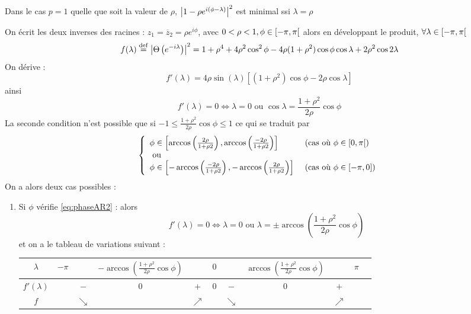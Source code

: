 \documentclass{report}
\begin{document}
\begin{Ex}[Cas où p=1]
Dans le cas $p=1$ quelle que soit la valeur de $\rho$, ${ \left| 1-\rho e^{i(\phi-\lambda)} \right|}^2$ est minimal ssi $\lambda = \rho$
\end{Ex}
\begin{Ex}[Cas où p=2 à racines complexes conjuguées]\label{ex:TVAR2}
On écrit les deux inverses des racines : $z_1=\overline{z}_2 = \rho e^{i\phi}$, avec $0<\rho<1, \phi \in {\left[ -\pi,\pi \right[}$ alors en développant le produit, $\forall \lambda \in {\left[ -\pi,\pi \right[}$
$$
f(\lambda) \stackrel{\rm def}{=} { \left| \Theta\left( e^{-i\lambda}\right) \right|}^2 = 1 + \rho^4 + 4\rho^2 \cos^2{\phi} - 4\rho(1+\rho^2)\cos{\phi} \cos{\lambda} + 2\rho^2\cos{2\lambda}
$$
On dérive :
$$
f'(\lambda) = 4\rho \sin(\lambda) \left[ (1+\rho^2) \cos{\phi} - 2\rho \cos{\lambda} \right]
$$
ainsi 
$$
f'(\lambda)=0 \iff \lambda = 0 \mbox{ ou } \cos{\lambda} = \frac{1+\rho^2}{2\rho} \cos{\phi}
$$
La seconde condition n'est possible que si $ -1\leq \frac{1+\rho^2}{2\rho} \cos{\phi} \leq 1$ ce qui se traduit par 
\begin{equation}\label{eq:phaseAR2}
{ \left\lbrace \begin{array}{ll} 
\phi \in {\left[ \arccos\left( \frac{2\rho}{1+\rho2} \right), \arccos\left( \frac{-2\rho}{1+\rho2} \right) \right]} & \mbox{ (cas où $\phi \in {\left[ 0,\pi \right[}$)} \\
\mbox{ ou } & \\
\phi \in {\left[ -\arccos\left( \frac{-2\rho}{1+\rho2} \right), -\arccos\left( \frac{2\rho}{1+\rho2} \right) \right]} & \mbox{ (cas où $\phi \in {\left[ -\pi,0 \right]}$)} \\
 \end{array} \right. }
\end{equation}
On a alors deux cas possibles :
\begin{enumerate}
\item Si $\phi$ vérifie \eqref{eq:phaseAR2} : alors 
$$
f'(\lambda)=0 \iff \lambda = 0 \mbox{ ou } \lambda = \pm \arccos\left(\frac{1+\rho^2}{2\rho} \cos{\phi}\right)
$$
et on a le tableau de variations suivant : \\
\begin{center}
\begin{tabular}{c|cccccccccc}
$\lambda$ & $-\pi$ & & $-\arccos\left(\frac{1+\rho^2}{2\rho} \cos{\phi}\right)$ & & $0$ & & $\arccos\left(\frac{1+\rho^2}{2\rho} \cos{\phi}\right)$ & & $\pi$  \\
\hline
$f'(\lambda)$ & & $-$ & $0$ & $+$ & $0$ & $-$ & $0$ & $+$ & \\
\hline
$f$ & & $\searrow$ & & $\nearrow$ & & $\searrow$ & & $\nearrow$ \\
\end{tabular}

\end{center}
\end{enumerate}
\end{Ex}
\end{document}
